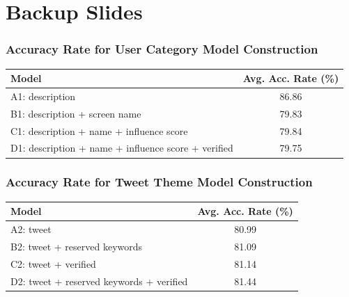 \documentclass[11pt]{beamer}
\begin{document}
\section*{Backup Slides}
\begin{frame}
\frametitle{Accuracy Rate for User Category Model Construction}
	\begin{table}[]
		\begin{tabular}{|l|c|}
			\hline
			Model & Avg. Acc. Rate (\%) \\ \hline
			A1: description & 86.86 \\ \hline
			B1: description + screen name & 79.83 \\ \hline
			C1: description + name + influence score & 79.84 \\ \hline
			D1: description + name + influence score + verified & 79.75 \\ \hline
		\end{tabular}
	\end{table}
\end{frame}

\begin{frame}
\frametitle{ Accuracy Rate for Tweet Theme Model Construction}
\begin{table}[]
	\begin{tabular}{|l|c|}
		\hline
		Model & Avg. Acc. Rate (\%) \\ \hline
		A2: tweet & 80.99 \\ \hline
		B2: tweet + reserved keywords & 81.09 \\ \hline
		C2: tweet + verified & 81.14 \\ \hline
		D2: tweet + reserved keywords + verified & 81.44 \\ \hline
	\end{tabular}
\end{table}
\end{frame}
\end{document}
